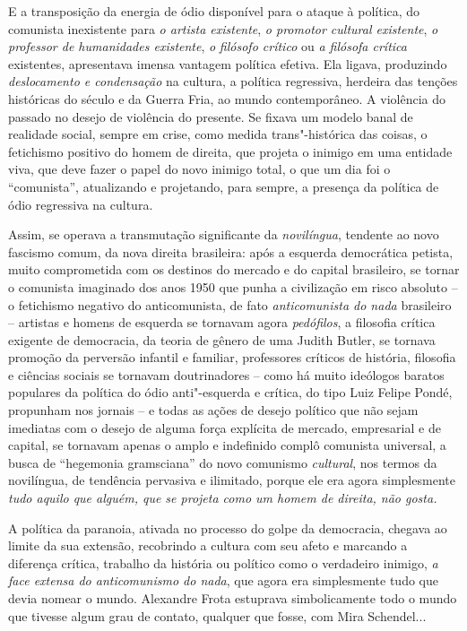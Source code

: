 E a transposição da energia de ódio disponível para o ataque à política,
do comunista inexistente para \emph{o artista existente}, \emph{o
promotor cultural existente}, \emph{o} \emph{professor de humanidades
existente}, \emph{o} \emph{filósofo crítico} ou \emph{a filósofa
crítica} existentes, apresentava imensa vantagem política efetiva. Ela
ligava, produzindo \emph{deslocamento e condensação} na cultura, a
política regressiva, herdeira das tenções históricas do século  e da
Guerra Fria, ao mundo contemporâneo. A violência do passado no desejo de
violência do presente. Se fixava um modelo banal de realidade social,
sempre em crise, como medida trans"-histórica das coisas, o fetichismo
positivo do homem de direita, que projeta o inimigo em uma entidade
viva, que deve fazer o papel do novo inimigo total, o que um dia foi o
``comunista'', atualizando e projetando, para sempre, a presença da
política de ódio regressiva na cultura.

Assim, se operava a transmutação significante da \emph{novilíngua},
tendente ao novo fascismo comum, da nova direita brasileira: após a
esquerda democrática petista, muito comprometida com os destinos do
mercado e do capital brasileiro, se tornar o comunista imaginado dos
anos 1950 que punha a civilização em risco absoluto -- o fetichismo
negativo do anticomunista, de fato \emph{anticomunista do nada}
brasileiro -- artistas e homens de esquerda se tornavam agora
\emph{pedófilos}, a filosofia crítica exigente de democracia, da teoria
de gênero de uma Judith Butler, se tornava promoção da perversão
infantil e familiar, professores críticos de história, filosofia e
ciências sociais se tornavam doutrinadores -- como há muito ideólogos
baratos populares da política do ódio anti"-esquerda e crítica, do tipo
Luiz Felipe Pondé, propunham nos jornais -- e todas as ações de desejo
político que não sejam imediatas com o desejo de alguma força explícita
de mercado, empresarial e de capital, se tornavam apenas o amplo e
indefinido complô comunista universal, a busca de ``hegemonia
gramsciana'' do novo comunismo \emph{cultural}, nos termos da
novilíngua, de tendência pervasiva e ilimitado, porque ele era agora
simplesmente \emph{tudo aquilo que alguém, que se projeta como um homem
de direita, não gosta. }

A política da paranoia, ativada no processo do golpe da democracia,
chegava ao limite da sua extensão, recobrindo a cultura com seu afeto e
marcando a diferença crítica, trabalho da história ou político como o
verdadeiro inimigo, \emph{a face extensa do anticomunismo do nada}, que
agora era simplesmente tudo que devia nomear o mundo. Alexandre Frota
estuprava simbolicamente todo o mundo que tivesse algum grau de contato,
qualquer que fosse, com Mira Schendel...

